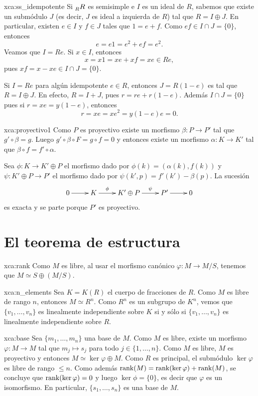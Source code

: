 \begin{sol}{xca:ss_idempotente}
Si $\prescript{}{R}R$ es semisimple e $I$ es un ideal de $R$, sabemos que existe un submódulo $J$ (es decir, $J$ es ideal a izquierda de $R$) tal que $R=I\oplus J$. En particular, 
existen $e\in I$ y $f\in J$ tales que $1=e+f$. Como $ef\in I\cap J=\{0\}$, entonces
\[
e=e1=e^2+ef=e^2.
\]
Veamos que $I=Re$. Si $x\in I$, entonces 
\[
	x=x1=xe+xf=xe\in Re,
\]
pues $xf=x-xe\in I\cap J=\{0\}$. 

Si $I=Re$ para algún idempotente $e\in R$, entonces $J=R(1-e)$ es tal que $R=I\oplus J$. En efecto, $R=I+J$, pues 
$r=re+r(1-e)$. Además $I\cap J=\{0\}$ pues si $r=xe=y(1-e)$, entonces 
\[
r=xe=xe^2=y(1-e)e=0.
\]
\end{sol}


\begin{sol}{xca:proyectivo1}
	Como $P$ es proyectivo existe un morfismo $\beta\colon P\to P'$ tal que $g'\circ \beta=g$.
	Luego $g'\circ \beta\circ F=g\circ f=0$ y entonces existe un morfismo $\alpha\colon K\to K'$
	tal que $\beta\circ f=f'\circ \alpha$. 

	Sea $\phi\colon K\to K'\oplus P$ el morfismo dado por
	$\phi(k)=(\alpha(k),f(k))$ y $\psi\colon K'\oplus P\to P'$ el morfismo dado
	por $\psi(k',p)=f'(k')-\beta(p)$. 
	La sucesión 
	\[
	\xymatrix{
	0\ar[r] 
	& K
	\ar[r]^-{\phi}
	& K'\oplus P
	\ar[r]^-{\psi}
	& P'\ar[r]
	& 0
	}
	\]
	es exacta y se parte porque $P'$ es proyectivo.
\end{sol}

\section*{El teorema de estructura}

\begin{sol}{xca:rank}
Como $M$ es libre, al usar el morfismo canónico $\varphi\colon M\to M/S$, tenemos que $M\simeq S\oplus (M/S)$.   
\end{sol}

\begin{sol}{xca:n_elements}
Sea $K=K(R)$ el cuerpo de fracciones de $R$. Como $M$ es libre de rango $n$, entonces $M\simeq R^n$. Como 
$R^n$ es un subgrupo de $K^n$, vemos que $\{v_1,\dots,v_n\}$ es linealmente independiente sobre $K$ si y sólo si $\{v_1,\dots,v_n\}$ 
es linealmente independiente sobre $R$.   
\end{sol}

\begin{sol}{xca:base}
Sea $\{m_1,\dots,m_n\}$ una base de $M$. Como $M$ es libre, existe un morfismo $\varphi\colon M\to M$ tal que $m_j\mapsto s_j$ para todo
$j\in\{1,\dots,n\}$. Como $M$ es libre, $M$ es proyectivo y entonces $M\simeq \ker\varphi\oplus M$. Como $R$ es principal, el submódulo
$\ker\varphi$ es libre de rango $\leq n$. Como además $\operatorname{rank}(M)=\operatorname{rank}(\ker\varphi)+\operatorname{rank}(M)$, se concluye que $\operatorname{rank}(\ker\varphi)=0$ y luego
$\ker\phi=\{0\}$, es decir que $\varphi$ es un isomorfismo. En particular, $\{s_1,\dots,s_n\}$ es una base de $M$.
\end{sol}

